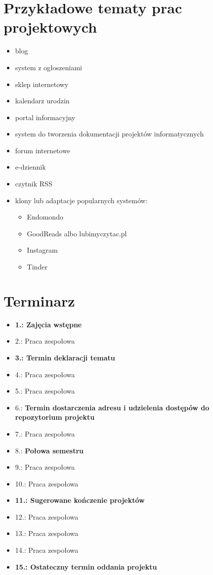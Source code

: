 \documentclass{article}
\begin{document}
	\section{Przykładowe tematy prac projektowych}
	\begin{multicols}{2}
		\begin{itemize}
			\item blog
			\item system z ogłoszeniami
			\item sklep internetowy
			\item kalendarz urodzin
			\item portal informacyjny
			\item system do tworzenia dokumentacji projektów informatycznych
			\item forum internetowe
			\item e-dziennik
			\item czytnik RSS
			\item klony lub adaptacje popularnych systemów:
			\begin{itemize}
				\item Endomondo
				\item GoodReads albo lubimyczytac.pl
				\item Instagram
				\item Tinder
			\end{itemize}
		\end{itemize}
	\end{multicols}
	
	\section{Terminarz}
	\begin{multicols}{2}
		\begin{itemize}
			\item \textbf{1.: Zajęcia wstępne}
			\item 2.: Praca zespołowa
			\item \textbf{3.: Termin deklaracji tematu}
			\item 4.: Praca zespołowa
			\item 5.: Praca zespołowa
			\item 6.: \textbf{Termin dostarczenia adresu i udzielenia dostępów do repozytorium projektu}
			\item 7.: Praca zespołowa
			\item 8.: \textbf{Połowa semestru}
			\item 9.: Praca zespołowa
			\item 10.: Praca zespołowa
			\item \textbf{11.: Sugerowane kończenie projektów}
			\item 12.: Praca zespołowa
			\item 13.: Praca zespołowa
			\item 14.: Praca zespołowa
			\item \textbf{15.: Ostateczny termin oddania projektu}
		\end{itemize}
	\end{multicols}
\end{document}
